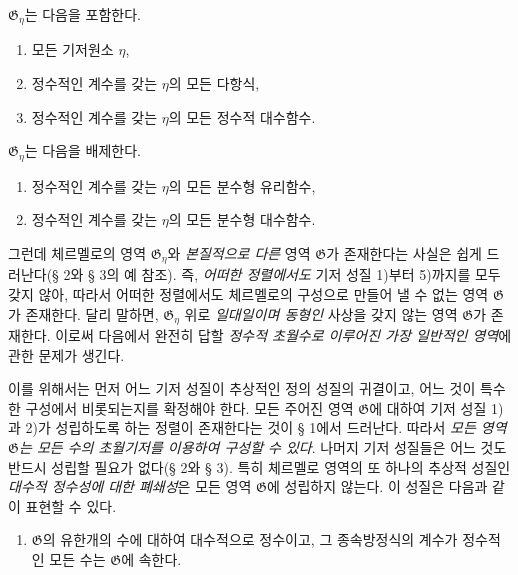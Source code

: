 $\mathfrak G_\eta$는 다음을 포함한다.
\begin{enumerate}
\item[1)] 모든 기저원소 $\eta$,
\item[2)] 정수적인 계수를 갖는 $\eta$의 모든 다항식,
\item[3)] 정수적인 계수를 갖는 $\eta$의 모든 정수적 대수함수.
\end{enumerate}
$\mathfrak G_\eta$는 다음을 배제한다.
\begin{enumerate}
\item[4)] 정수적인 계수를 갖는 $\eta$의 모든 분수형 유리함수,
\item[5)] 정수적인 계수를 갖는 $\eta$의 모든 분수형 대수함수.
\end{enumerate}

그런데 체르멜로의 영역 $\mathfrak G_\eta$와 \emph{본질적으로 다른} 영역 $\mathfrak G$가 존재한다는 사실은 쉽게 드러난다(§ 2와 § 3의 예 참조). 즉, \emph{어떠한 정렬에서도} 기저 성질 1)부터 5)까지를 모두 갖지 않아, 따라서 어떠한 정렬에서도 체르멜로의 구성으로 만들어 낼 수 없는 영역 $\mathfrak G$가 존재한다. 달리 말하면, $\mathfrak G_\eta$ 위로 \emph{일대일이며 동형인} 사상을 갖지 않는 영역 $\mathfrak G$가 존재한다. 이로써 다음에서 완전히 답할 \emph{정수적 초월수로 이루어진 가장 일반적인 영역}에 관한 문제가 생긴다.

이를 위해서는 먼저 어느 기저 성질이 추상적인 정의 성질의 귀결이고, 어느 것이 특수한 구성에서 비롯되는지를 확정해야 한다. 모든 주어진 영역 $\mathfrak G$에 대하여 기저 성질 1)과 2)가 성립하도록 하는 정렬이 존재한다는 것이 § 1에서 드러난다. 따라서 \emph{모든 영역 $\mathfrak G$는 모든 수의 초월기저를 이용하여 구성할 수 있다}. 나머지 기저 성질들은 어느 것도 반드시 성립할 필요가 없다(§ 2와 § 3). 특히 체르멜로 영역의 또 하나의 추상적 성질인 \emph{대수적 정수성에 대한 폐쇄성}은 모든 영역 $\mathfrak G$에 성립하지 않는다. 이 성질은 다음과 같이 표현할 수 있다.
\begin{enumerate}
\item[V.] $\mathfrak G$의 유한개의 수에 대하여 대수적으로 정수이고, 그 종속방정식의 계수가 정수적인 모든 수는 $\mathfrak G$에 속한다.
\end{enumerate}

